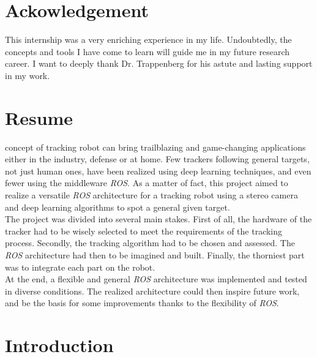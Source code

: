 
\vspace{50pt}

\section*{Ackowledgement}\label{thk}

This internship was a very enriching experience in my life.
Undoubtedly, the concepts and tools I have come to learn will 
guide me in my future research career. I want to deeply thank
Dr. Trappenberg for his astute and lasting support
in my work.


\clearpage

\section*{Resume}

 concept of tracking robot can bring trailblazing and 
game-changing applications either in the industry, defense or
at home. Few trackers following general targets, not just 
human ones, have been realized using deep learning
techniques, and even fewer using the middleware
\textit{ROS}. As a matter of fact, this project aimed to 
realize a versatile \textit{ROS} architecture
for a tracking robot using a stereo camera
and deep learning algorithms to spot a 
general given target.
\\\indent The project was divided into 
several main stakes. First of all, the hardware
of the tracker had to be wisely selected to 
meet the requirements of the tracking process. 
Secondly, the tracking algorithm had to be chosen 
and assessed. The \textit{ROS} architecture had 
then to be imagined and built. Finally, the thorniest 
part was to integrate each part on the robot.
\\\indent At the end, a flexible and general \textit{ROS}
architecture was implemented and tested in diverse 
conditions. The realized architecture 
could then inspire future work, and be the basis 
for some improvements thanks to the flexibility of \textit{ROS}.


\clearpage
\section*{Introduction}

